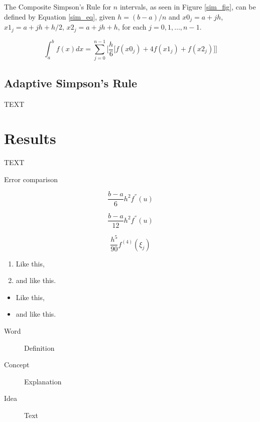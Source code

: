 \documentclass[a4paper]{article}
\begin{document}
The Composite Simpson's Rule for $n$ intervals, as seen in Figure \ref{sim_fig}, can be defined by Equation \ref{sim_eq}, given $h=(b-a)/n$ and $x0_j=a+jh$, $x1_j=a+jh+h/2$, $x2_j=a+jh+h$,  for each $j=0,1,\dots,n-1$.
 
    
\begin{equation}
\int_{a}^b f(x) dx = \sum_{j=0}^{n-1} \Bigg[ \frac{h}{6} \big[ f(x0_j) + 4f(x1_j) + f(x2_j) \big] \Bigg]
\label{sim_eq}
\end{equation}



\subsection{Adaptive Simpson's Rule}
TEXT



\newpage
\section{Results}
\label{sec:results}

TEXT

Error comparison

\begin{equation}
\frac{b-a}{6}h^2f^{''}(u)
\label{trap_err}
\end{equation}

\begin{equation}
\frac{b-a}{12}h^2f^{''}(u)
\label{mid_err}
\end{equation}

\begin{equation}
\frac{h^5}{90}f^{(4)}(\xi_j)
\label{sim_err}
\end{equation}
  


\begin{enumerate}
\item Like this,
\item and like this.
\end{enumerate}

\begin{itemize}
\item Like this,
\item and like this.
\end{itemize}

\begin{description}
\item[Word] Definition
\item[Concept] Explanation
\item[Idea] Text
\end{description}
\end{document}
